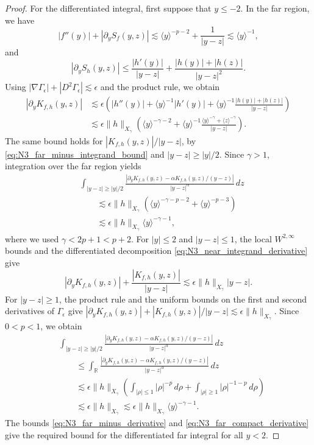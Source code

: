 \documentclass[11pt]{amsart}
\theoremstyle{definition}
\theoremstyle{remark}
\numberwithin{equation}{section}
\newcommand{\R}{\mathbb{R}}
\newcommand{\ang}[1]{\langle #1 \rangle}
\begin{document}
\begin{proof}
For the differentiated integral, first suppose that $y\leq-2$.
In the far region, we have
\[
    |f''(y)|+|\partial_yS_f(y,z)|
    \lesssim\ang{y}^{-p-2}+\frac{1}{|y-z|}
    \lesssim\ang{y}^{-1},
\]
and
\[
    |\partial_yS_h(y,z)|
    \leq\frac{|h'(y)|}{|y-z|}
    +\frac{|h(y)|+|h(z)|}{|y-z|^2}.
\]
Using $|\nabla \Gamma_\epsilon|+|D^2\Gamma_\epsilon|\lesssim\epsilon$ and the product rule, we obtain
\begin{align*}
    |\partial_yK_{f,h}(y,z)|
    &\lesssim\epsilon\left(|h''(y)|+\ang{y}^{-1}|h'(y)|
    +\ang{y}^{-1}\frac{|h(y)|+|h(z)|}{|y-z|}\right)\\
    &\lesssim\epsilon\|h\|_{X_\gamma}\left(
    \ang{y}^{-\gamma-2}
    +\ang{y}^{-1}\frac{\ang{y}^{-\gamma}+\ang{z}^{-\gamma}}{|y-z|}\right).
\end{align*}
The same bound holds for $|K_{f,h}(y,z)|/|y-z|$, by \eqref{eq:N3_far_minus_integrand_bound} and $|y-z|\geq |y|/2$.
Since $\gamma>1$, integration over the far region yields
\begin{equation}\label{eq:N3_far_minus_derivative}
\begin{aligned}
    &\int_{|y-z|\geq |y|/2}
    \frac{|\partial_yK_{f,h}(y,z)-\alpha K_{f,h}(y,z)/(y-z)|}{|y-z|^\alpha}\,dz\\
    &\qquad\lesssim\epsilon\|h\|_{X_\gamma}\left(
    \ang{y}^{-\gamma-p-2}+\ang{y}^{-p-3}\right)\\
    &\qquad\lesssim\epsilon\|h\|_{X_\gamma}\ang{y}^{-\gamma-1},
\end{aligned}
\end{equation}
where we used $\gamma<2p+1<p+2$.
For $|y|\leq2$ and $|y-z|\leq1$, the local $W^{2,\infty}$ bounds and the
differentiated decomposition \eqref{eq:N3_near_integrand_derivative} give
\[
    |\partial_yK_{f,h}(y,z)|+\frac{|K_{f,h}(y,z)|}{|y-z|}
    \lesssim\epsilon\|h\|_{X_\gamma}|y-z|.
\]
For $|y-z|\geq1$, the product rule and the uniform bounds on the first
and second derivatives of $\Gamma_\epsilon$ give
$|\partial_yK_{f,h}(y,z)|+|K_{f,h}(y,z)|/|y-z|\lesssim\epsilon\|h\|_{X_\gamma}$.
Since $0<p<1$, we obtain
\begin{equation}\label{eq:N3_far_compact_derivative}
\begin{aligned}
    &\int_{|y-z|\geq |y|/2}
    \frac{|\partial_yK_{f,h}(y,z)-\alpha K_{f,h}(y,z)/(y-z)|}{|y-z|^\alpha}\,dz\\
    &\qquad\leq\int_{\R}
    \frac{|\partial_yK_{f,h}(y,z)-\alpha K_{f,h}(y,z)/(y-z)|}{|y-z|^\alpha}\,dz\\
    &\qquad\lesssim\epsilon\|h\|_{X_\gamma}\left(
    \int_{|\rho|\leq1}|\rho|^{-p}\,d\rho
    +\int_{|\rho|\geq1}|\rho|^{-1-p}\,d\rho\right)\\
    &\qquad\lesssim\epsilon\|h\|_{X_\gamma}
    \lesssim\epsilon\|h\|_{X_\gamma}\ang{y}^{-\gamma-1}.
\end{aligned}
\end{equation}
The bounds \eqref{eq:N3_far_minus_derivative} and \eqref{eq:N3_far_compact_derivative} give the required bound for the differentiated far integral for all $y<2$.


\end{proof}
\end{document}
